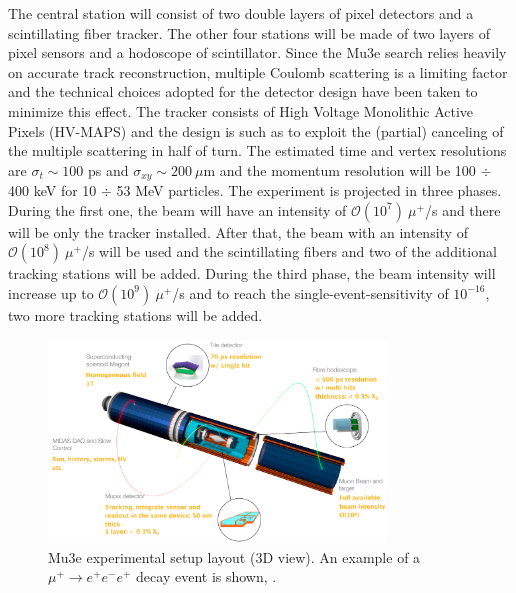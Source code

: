 The central station will consist of two double layers of pixel detectors and a
scintillating fiber tracker. The other four stations will be made of two layers of pixel
sensors and a hodoscope of scintillator. Since the Mu3e search relies heavily on accurate track reconstruction, multiple Coulomb
scattering is a limiting factor and the technical choices adopted for the detector design
have been taken to minimize this effect. The tracker consists of High Voltage Monolithic Active Pixels (HV-MAPS) 
and the design is such as to exploit the (partial) canceling of
the multiple scattering in half of turn. The estimated time and vertex resolutions are
$\sigma_t \sim 100$ ps and $\sigma_{xy} \sim 200 \ \mu$m and the momentum resolution will be 100 $\div$ 400 keV for 10 $\div$ 53
MeV particles. The experiment is projected in three phases. During the first one, the beam will have an intensity of $\mathcal{O}(10^7) \ \mu^+$/s 
and there will be only the tracker installed. After that, the beam with an intensity of $\mathcal{O}(10^8) \ \mu^+$/s will 
be used and the scintillating fibers and two of the additional tracking stations will be added.
During the third phase, the beam intensity will increase up to $\mathcal{O}(10^9) \ \mu^+$/s and to 
reach the single-event-sensitivity of $10^{-16}$, two more tracking stations will be added.
\begin{figure}[!h]
\centering
\includegraphics[width =0.8\textwidth]{figures/png/Screenshot_20240321_143650}
\caption[Mu3e experiment.]{Mu3e experimental setup layout (3D view). An example of a $\mu^+ \rightarrow e^+ e^-  e^+ $ decay event is shown, \cite{papa}.}
\label{fig:mu3e}
\end{figure}









